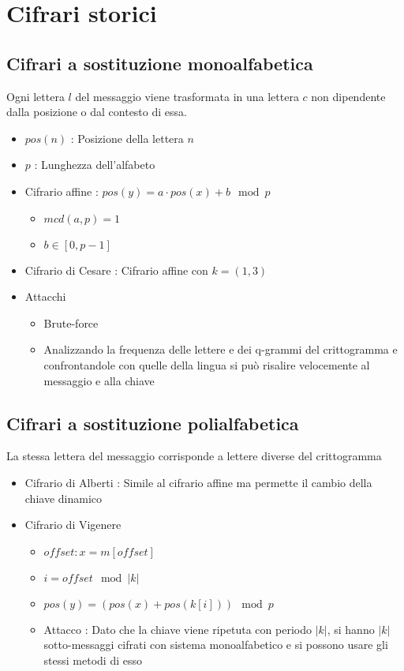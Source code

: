 \chapter{Cifrari storici}

\section{Cifrari a sostituzione monoalfabetica}

Ogni lettera $l$ del messaggio viene trasformata in una lettera $c$ non dipendente dalla posizione o dal contesto di essa.

\begin{itemize}
    \item $pos(n)$ : Posizione della lettera $n$
    \item $p$ : Lunghezza dell'alfabeto
    \item Cifrario affine : $pos(y) = a \cdot pos(x) + b \mod{p}$
    \begin{itemize}
        \item $mcd(a, p) = 1$
        \item $b \in [0, p-1]$
    \end{itemize}
    \item Cifrario di Cesare : Cifrario affine con $k = (1, 3)$
    \item Attacchi
    \begin{itemize}
        \item Brute-force
        \item Analizzando la frequenza delle lettere e dei q-grammi del crittogramma e confrontandole con quelle della lingua si pu\`o risalire velocemente al messaggio e alla chiave
    \end{itemize}
\end{itemize}

\section{Cifrari a sostituzione polialfabetica}

La stessa lettera del messaggio corrisponde a lettere diverse del crittogramma

\begin{itemize}
    \item Cifrario di Alberti : Simile al cifrario affine ma permette il cambio della chiave dinamico\
    \newpage
    \item Cifrario di Vigenere
    \begin{itemize}
        \item $offset : x = m[offset]$
        \item $i = offset \mod{|k|}$
        \item $pos(y) = (pos(x) + pos(k[i])) \mod{p}$
        \item Attacco : Dato che la chiave viene ripetuta con periodo $|k|$, si hanno $|k|$ sotto-messaggi cifrati con sistema monoalfabetico e si possono usare gli stessi metodi di esso
    \end{itemize}
\end{itemize}

